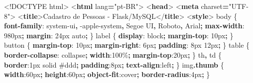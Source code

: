 \documentclass[
]{book}
\newenvironment{Shaded}{\begin{snugshade}}{\end{snugshade}}
\newcommand{\BuiltInTok}[1]{#1}
\newcommand{\CharTok}[1]{\textcolor[rgb]{0.31,0.60,0.02}{#1}}
\newcommand{\ConstantTok}[1]{\textcolor[rgb]{0.56,0.35,0.01}{#1}}
\newcommand{\DataTypeTok}[1]{\textcolor[rgb]{0.13,0.29,0.53}{#1}}
\newcommand{\DecValTok}[1]{\textcolor[rgb]{0.00,0.00,0.81}{#1}}
\newcommand{\FunctionTok}[1]{\textcolor[rgb]{0.13,0.29,0.53}{\textbf{#1}}}
\newcommand{\KeywordTok}[1]{\textcolor[rgb]{0.13,0.29,0.53}{\textbf{#1}}}
\newcommand{\NormalTok}[1]{#1}
\newcommand{\OperatorTok}[1]{\textcolor[rgb]{0.81,0.36,0.00}{\textbf{#1}}}
\newcommand{\OtherTok}[1]{\textcolor[rgb]{0.56,0.35,0.01}{#1}}
\newcommand{\StringTok}[1]{\textcolor[rgb]{0.31,0.60,0.02}{#1}}
\begin{document}
\begin{Shaded}
\begin{Highlighting}[]
\DataTypeTok{\textless{}!DOCTYPE}\NormalTok{ html}\DataTypeTok{\textgreater{}}
\DataTypeTok{\textless{}}\KeywordTok{html}\OtherTok{ lang}\OperatorTok{=}\StringTok{"pt{-}BR"}\DataTypeTok{\textgreater{}}
\DataTypeTok{\textless{}}\KeywordTok{head}\DataTypeTok{\textgreater{}}
\DataTypeTok{\textless{}}\KeywordTok{meta}\OtherTok{ charset}\OperatorTok{=}\StringTok{"UTF{-}8"}\DataTypeTok{\textgreater{}}
\DataTypeTok{\textless{}}\KeywordTok{title}\DataTypeTok{\textgreater{}}\NormalTok{Cadastro de Pessoas {-} Flask/MySQL}\DataTypeTok{\textless{}/}\KeywordTok{title}\DataTypeTok{\textgreater{}}
\DataTypeTok{\textless{}}\KeywordTok{style}\DataTypeTok{\textgreater{}}
\NormalTok{  body \{ }\KeywordTok{font{-}family}\CharTok{:} \DecValTok{system{-}ui}\OperatorTok{,} \DecValTok{{-}apple{-}system}\OperatorTok{,} \DecValTok{Segoe UI}\OperatorTok{,} \DecValTok{Roboto}\OperatorTok{,} \DecValTok{Arial}\OperatorTok{;} \KeywordTok{max{-}width}\CharTok{:} \DecValTok{980}\DataTypeTok{px}\OperatorTok{;} \KeywordTok{margin}\CharTok{:} \DecValTok{24}\DataTypeTok{px} \BuiltInTok{auto}\OperatorTok{;}\NormalTok{ \}}
\NormalTok{  label \{ }\KeywordTok{display}\CharTok{:} \DecValTok{block}\OperatorTok{;} \KeywordTok{margin{-}top}\CharTok{:} \DecValTok{10}\DataTypeTok{px}\OperatorTok{;}\NormalTok{ \}}
\NormalTok{  button \{ }\KeywordTok{margin{-}top}\CharTok{:} \DecValTok{10}\DataTypeTok{px}\OperatorTok{;} \KeywordTok{margin{-}right}\CharTok{:} \DecValTok{6}\DataTypeTok{px}\OperatorTok{;} \KeywordTok{padding}\CharTok{:} \DecValTok{8}\DataTypeTok{px} \DecValTok{12}\DataTypeTok{px}\OperatorTok{;}\NormalTok{ \}}
\NormalTok{  table \{ }\KeywordTok{border{-}collapse}\CharTok{:} \DecValTok{collapse}\OperatorTok{;} \KeywordTok{width}\CharTok{:}\DecValTok{100}\DataTypeTok{\%}\OperatorTok{;} \KeywordTok{margin{-}top}\CharTok{:}\DecValTok{20}\DataTypeTok{px}\OperatorTok{;}\NormalTok{ \}}
\NormalTok{  th}\OperatorTok{,}\NormalTok{ td \{ }\KeywordTok{border}\CharTok{:}\DecValTok{1}\DataTypeTok{px} \DecValTok{solid} \ConstantTok{\#ddd}\OperatorTok{;} \KeywordTok{padding}\CharTok{:}\DecValTok{8}\DataTypeTok{px}\OperatorTok{;} \KeywordTok{text{-}align}\CharTok{:}\DecValTok{left}\OperatorTok{;}\NormalTok{ \}}
\NormalTok{  img}\FunctionTok{.thumb}\NormalTok{ \{ }\KeywordTok{width}\CharTok{:}\DecValTok{60}\DataTypeTok{px}\OperatorTok{;} \KeywordTok{height}\CharTok{:}\DecValTok{60}\DataTypeTok{px}\OperatorTok{;} \KeywordTok{object{-}fit}\CharTok{:}\DecValTok{cover}\OperatorTok{;} \KeywordTok{border{-}radius}\CharTok{:}\DecValTok{4}\DataTypeTok{px}\OperatorTok{;}\NormalTok{ \}}

\end{Highlighting}
\end{Shaded}
\end{document}
